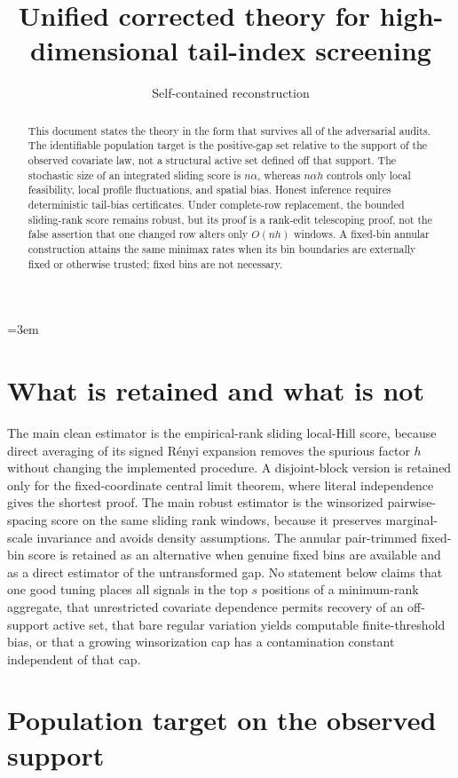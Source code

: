 \documentclass[11pt]{article}
\title{Unified corrected theory for high-dimensional tail-index screening}
\author{Self-contained reconstruction}
\date{}
\theoremstyle{definition}\newtheorem{definition}[theorem]{Definition}
\theoremstyle{remark}\newtheorem{remark}[theorem]{Remark}
\newcommand{\1}{\mathbf 1}
\begin{document}
\maketitle
\emergencystretch=3em

\begin{abstract}
This document states the theory in the form that survives all of the
adversarial audits. The identifiable population target is the positive-gap
set relative to the support of the observed covariate law, not a structural
active set defined off that support. The stochastic size of an integrated
sliding score is $n\alpha$, whereas $n\alpha h$ controls only local
feasibility, local profile fluctuations, and spatial bias. Honest inference
requires deterministic tail-bias certificates. Under complete-row
replacement, the bounded sliding-rank score remains robust, but its proof is a
rank-edit telescoping proof, not the false assertion that one changed row
alters only $O(nh)$ windows. A fixed-bin annular construction attains the same
minimax rates when its bin boundaries are externally fixed or otherwise
trusted; fixed bins are not necessary.
\end{abstract}

\section{What is retained and what is not}

The main clean estimator is the empirical-rank sliding local-Hill score,
because direct averaging of its signed R\'enyi expansion removes the spurious
factor $h$ without changing the implemented procedure. A disjoint-block
version is retained only for the fixed-coordinate central limit theorem,
where literal independence gives the shortest proof. The main robust
estimator is the winsorized pairwise-spacing score on the same sliding rank
windows, because it preserves marginal-scale invariance and avoids density
assumptions. The annular pair-trimmed fixed-bin score is retained as an
alternative when genuine fixed bins are available and as a direct estimator
of the untransformed gap. No statement below claims that one good tuning
places all signals in the top $s$ positions of a minimum-rank aggregate, that
unrestricted covariate dependence permits recovery of an off-support active
set, that bare regular variation yields computable finite-threshold bias, or
that a growing winsorization cap has a contamination constant independent of
that cap.

\section{Population target on the observed support}
\end{document}
